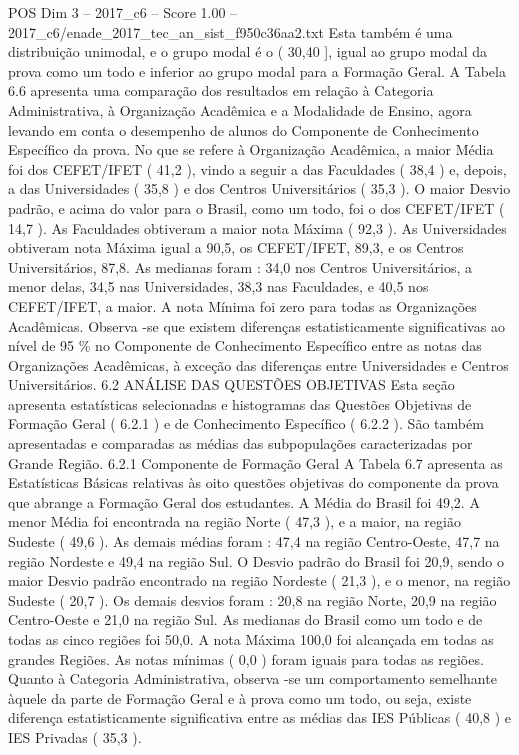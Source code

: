 \begin{textsample}{POS Dim 3 – 2017\_c6 – Score 1.00 – 2017\_c6/enade\_2017\_tec\_an\_sist\_f950c36aa2.txt}
Esta também é uma distribuição unimodal, e o grupo modal é o ( 30,40 ], igual ao grupo modal da prova como um todo e inferior ao grupo modal para a Formação Geral.
A Tabela 6.6 apresenta uma comparação dos resultados em relação à Categoria Administrativa, à Organização Acadêmica e a Modalidade de Ensino, agora levando em conta o desempenho de alunos do Componente de Conhecimento Específico da prova.
No que se refere à Organização Acadêmica, a maior Média foi dos CEFET/IFET ( 41,2 ), vindo a seguir a das Faculdades ( 38,4 ) e, depois, a das Universidades ( 35,8 ) e dos Centros Universitários ( 35,3 ).
O maior Desvio padrão, e acima do valor para o Brasil, como um todo, foi o dos CEFET/IFET ( 14,7 ).
As Faculdades obtiveram a maior nota Máxima ( 92,3 ).
As Universidades obtiveram nota Máxima igual a 90,5, os CEFET/IFET, 89,3, e os Centros Universitários, 87,8.
As medianas foram : 34,0 nos Centros Universitários, a menor delas, 34,5 nas Universidades, 38,3 nas Faculdades, e 40,5 nos CEFET/IFET, a maior.
A nota Mínima foi zero para todas as Organizações Acadêmicas.
Observa -se que existem diferenças estatisticamente significativas ao nível de 95 \% no Componente de Conhecimento Específico entre as notas das Organizações Acadêmicas, à exceção das diferenças entre Universidades e Centros Universitários. 6.2 ANÁLISE DAS QUESTÕES OBJETIVAS Esta seção apresenta estatísticas selecionadas e histogramas das Questões Objetivas de Formação Geral ( 6.2.1 ) e de Conhecimento Específico ( 6.2.2 ).
São também apresentadas e comparadas as médias das subpopulações caracterizadas por Grande Região. 6.2.1 Componente de Formação Geral A Tabela 6.7 apresenta as Estatísticas Básicas relativas às oito questões objetivas do componente da prova que abrange a Formação Geral dos estudantes.
A Média do Brasil foi 49,2.
A menor Média foi encontrada na região Norte ( 47,3 ), e a maior, na região Sudeste ( 49,6 ).
As demais médias foram : 47,4 na região Centro-Oeste, 47,7 na região Nordeste e 49,4 na região Sul.
O Desvio padrão do Brasil foi 20,9, sendo o maior Desvio padrão encontrado na região Nordeste ( 21,3 ), e o menor, na região Sudeste ( 20,7 ).
Os demais desvios foram : 20,8 na região Norte, 20,9 na região Centro-Oeste e 21,0 na região Sul.
As medianas do Brasil como um todo e de todas as cinco regiões foi 50,0.
A nota Máxima 100,0 foi alcançada em todas as grandes Regiões.
As notas mínimas ( 0,0 ) foram iguais para todas as regiões.
Quanto à Categoria Administrativa, observa -se um comportamento semelhante àquele da parte de Formação Geral e à prova como um todo, ou seja, existe diferença estatisticamente significativa entre as médias das IES Públicas ( 40,8 ) e IES Privadas ( 35,3 ).

\end{textsample}
